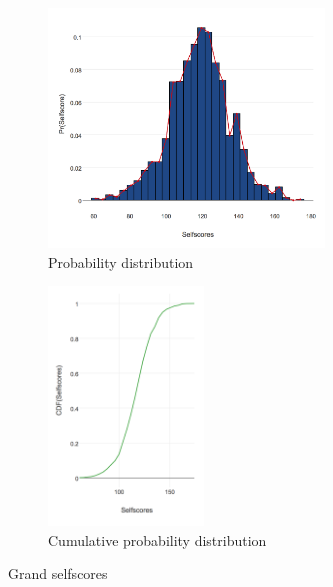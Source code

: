 \begin{figure}[htb]
   \centering
    \begin{subfigure}[t]{0.6\textwidth}
        \centering
        \includegraphics[height=2.5in]{dataset/grand/selfscores}
        \caption{Probability distribution}
    \end{subfigure}%
    \begin{subfigure}[t]{0.35\textwidth}
        \centering
        \includegraphics[height=2.5in]{dataset/grand/cdf_selfscores}
        \caption{Cumulative probability distribution}
    \end{subfigure}
    \caption{Grand selfscores}


\end{figure}
